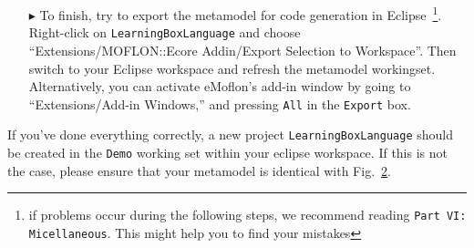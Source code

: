 \begin{enumerate}
\begin{figure}[htbp]
	\centering
  \texttt{[image: ea\_operationCheck]}
	\caption{All operations in \texttt{Partition}}
	\label{fig:operation_partition}
\end{figure}

If you've done everything right, your dialogue should now contain three methods: \texttt{check}, \texttt{empty}, and \texttt{removeCard}, each with
corresponding parameters and return types as in Fig.~\ref{fig:operation_partition}.

Add all operations analogously for \texttt{Box} and \texttt{Card}, so that your metamodel closely resembles Fig.~\ref{fig:metamodel_complete}.

\begin{figure}[htbp]
	\centering
  \texttt{[image: ea\_metamodelComplete.png]}
\caption[Complete metamodel for our learning box.]{Complete metamodel for our learning box \\ \emph{\small Please note that names of parameters may not be
displayed by default in EA.}}
	\label{fig:metamodel_complete}
\end{figure}

\pagebreak

To see how this complete metamodel is represented in the textual syntax, review Fig.~\ref{fig:workspaceMethods} in \hyperlink{sec:static tex}{section 2.2}.

\item[$\blacktriangleright$] To finish, try to export the metamodel for code generation in Eclipse~\footnote{if problems occur during the following steps, we
recommend reading \texttt{Part VI: Micellaneous}. This might help you to find your mistakes}. Right-click on \texttt{LearningBoxLanguage} and choose
``Extensions/MOFLON::Ecore Addin/Export Selection to Workspace''. Then switch to your Eclipse work\-space and refresh the metamodel workingset. Alternatively,
you can activate eMoflon's add-in window by going to ``Extensions/Add-in Windows,'' and pressing \texttt{All} in the \texttt{Export} box.

\end{enumerate}

If you've done everything correctly, a new project \texttt{LearningBoxLanguage} should be created in the \texttt{Demo} working set within your eclipse
workspace. If this is not the case, please ensure that your metamodel is identical with Fig.~\ref{fig:metamodel_complete}.

